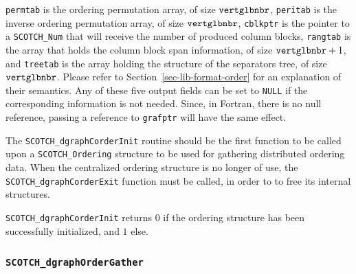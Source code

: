 \begin{itemize}
{\tt permtab} is the ordering permutation array, of size ${\tt
vert\lbt glb\lbt nbr}$, {\tt peritab} is the inverse ordering permutation array,
of size ${\tt vert\lbt glb\lbt nbr}$, {\tt cblkptr} is the pointer to a
{\tt SCOTCH\_\lbt Num} that will receive the number of produced
column blocks, {\tt rangtab} is the array that holds the column block
span information, of size $\mbox{\tt vert\lbt glb\lbt nbr} + 1$, and {\tt treetab}
is the array holding the structure of the separators tree, of size
${\tt vert\lbt glb\lbt nbr}$. Please refer to
Section~\ref{sec-lib-format-order} for an explanation of their semantics.
Any of these five output fields can be set to {\tt NULL} if the
corresponding information is not needed. Since, in Fortran, there is
no null reference, passing a reference to {\tt grafptr} will have the
same effect.

The {\tt SCOTCH\_\lbt dgraph\lbt Corder\lbt Init} routine should be
the first function to be called upon a {\tt SCOTCH\_\lbt Ordering}
structure to be used for gathering distributed ordering data. When the
centralized ordering structure is no longer of use, the {\tt
SCOTCH\_\lbt dgraph\lbt Corder\lbt Exit} function must be called, in
order to to free its internal structures.

\progret

{\tt SCOTCH\_dgraphCorderInit} returns $0$ if the ordering structure has
been successfully initialized, and $1$ else.
\end{itemize}

\subsubsection{{\tt SCOTCH\_dgraphOrderGather}}
\label{sec-lib-dgraph-order-gather}

